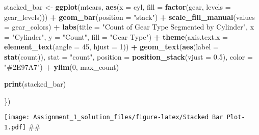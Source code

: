 \documentclass[
]{article}
\newenvironment{Shaded}{\begin{snugshade}}{\end{snugshade}}
\newcommand{\AttributeTok}[1]{\textcolor[rgb]{0.13,0.29,0.53}{#1}}
\newcommand{\DecValTok}[1]{\textcolor[rgb]{0.00,0.00,0.81}{#1}}
\newcommand{\FloatTok}[1]{\textcolor[rgb]{0.00,0.00,0.81}{#1}}
\newcommand{\FunctionTok}[1]{\textcolor[rgb]{0.13,0.29,0.53}{\textbf{#1}}}
\newcommand{\NormalTok}[1]{#1}
\newcommand{\OtherTok}[1]{\textcolor[rgb]{0.56,0.35,0.01}{#1}}
\newcommand{\SpecialCharTok}[1]{\textcolor[rgb]{0.81,0.36,0.00}{\textbf{#1}}}
\newcommand{\StringTok}[1]{\textcolor[rgb]{0.31,0.60,0.02}{#1}}
\begin{document}
\begin{Shaded}
\begin{Highlighting}[]
\NormalTok{stacked\_bar }\OtherTok{\textless{}{-}} \FunctionTok{ggplot}\NormalTok{(mtcars, }\FunctionTok{aes}\NormalTok{(}\AttributeTok{x =}\NormalTok{ cyl, }\AttributeTok{fill =} \FunctionTok{factor}\NormalTok{(gear, }\AttributeTok{levels =}\NormalTok{ gear\_levels))) }\SpecialCharTok{+}
               \FunctionTok{geom\_bar}\NormalTok{(}\AttributeTok{position =} \StringTok{"stack"}\NormalTok{) }\SpecialCharTok{+}
               \FunctionTok{scale\_fill\_manual}\NormalTok{(}\AttributeTok{values =}\NormalTok{ gear\_colors) }\SpecialCharTok{+}
               \FunctionTok{labs}\NormalTok{(}\AttributeTok{title =} \StringTok{"Count of Gear Type Segmented by Cylinder"}\NormalTok{, }\AttributeTok{x =} \StringTok{"Cylinder"}\NormalTok{, }\AttributeTok{y =} \StringTok{"Count"}\NormalTok{, }\AttributeTok{fill =} \StringTok{"Gear Type"}\NormalTok{) }\SpecialCharTok{+}
               \FunctionTok{theme}\NormalTok{(}\AttributeTok{axis.text.x =} \FunctionTok{element\_text}\NormalTok{(}\AttributeTok{angle =} \DecValTok{45}\NormalTok{, }\AttributeTok{hjust =} \DecValTok{1}\NormalTok{)) }\SpecialCharTok{+}
               \FunctionTok{geom\_text}\NormalTok{(}\FunctionTok{aes}\NormalTok{(}\AttributeTok{label =} \FunctionTok{stat}\NormalTok{(count)), }\AttributeTok{stat =} \StringTok{"count"}\NormalTok{, }\AttributeTok{position =} \FunctionTok{position\_stack}\NormalTok{(}\AttributeTok{vjust =} \FloatTok{0.5}\NormalTok{), }\AttributeTok{color =} \StringTok{"\#2E97A7"}\NormalTok{) }\SpecialCharTok{+}
               \FunctionTok{ylim}\NormalTok{(}\DecValTok{0}\NormalTok{, max\_count)}

\FunctionTok{print}\NormalTok{(stacked\_bar)}

\NormalTok{\})}
\end{Highlighting}
\end{Shaded}

\texttt{[image: Assignment\_1\_solution\_files/figure-latex/Stacked Bar Plot-1.pdf]}
\#\#
\end{document}
